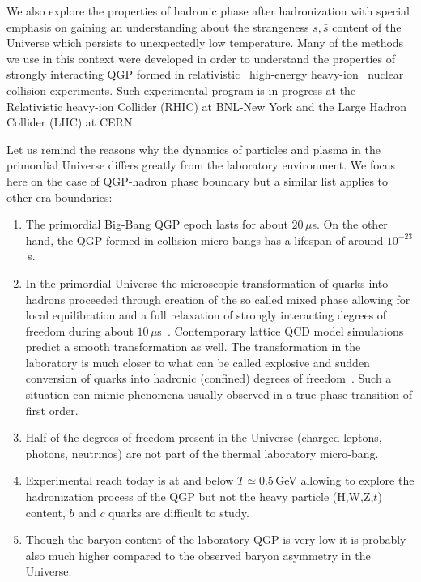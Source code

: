 We also explore the properties of hadronic phase after hadronization with special emphasis on gaining an understanding about the strangeness $s,\bar s$ content of the Universe which persists to unexpectedly low temperature. Many of the methods we use in this context were developed in order to understand the properties of strongly interacting QGP formed in relativistic \ie\ high-energy heavy-ion \ie\ nuclear collision experiments. Such experimental program is in progress at the Relativistic heavy-ion Collider (RHIC) at BNL-New York and the Large Hadron Collider (LHC) at CERN. 

Let us remind the reasons why the dynamics of particles and plasma in the primordial Universe differs greatly from the laboratory environment. We focus here on the case of QGP-hadron phase boundary but a similar list applies to other era boundaries:
\begin{enumerate} 
\item The primordial Big-Bang QGP epoch lasts for about $20\,\mu$s. On the other hand, the QGP formed in collision micro-bangs has a lifespan of around $10^{-23}$\,s. 
\item In the primordial Universe the microscopic transformation of quarks into hadrons proceeded through creation of the so called mixed phase allowing for local equilibration and a full relaxation of strongly interacting degrees of freedom during about $10\,\mu$s~\cite{Fromerth:2002wb}. Contemporary lattice QCD model simulations predict a smooth transformation as well. The transformation in the laboratory is much closer to what can be called explosive and sudden conversion of quarks into hadronic (confined) degrees of freedom~\cite{Rafelski:2000by}. Such a situation can mimic phenomena usually observed in a true phase transition of first order.
\item Half of the degrees of freedom present in the Universe (charged leptons, photons, neutrinos) are not part of the thermal laboratory micro-bang.
\item Experimental reach today is at and below $T\simeq 0.5$\,GeV allowing to explore the hadronization process of the QGP but not the heavy particle (H,W,Z,$t$) content, $b$ and $c$ quarks are difficult to study. 
\item Though the baryon content of the laboratory QGP is very low it is probably also much higher compared to the observed baryon asymmetry in the Universe. 
\end{enumerate}
 
